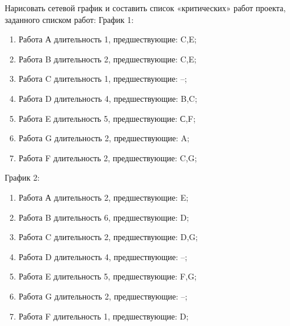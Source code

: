 \question
Нарисовать сетевой график и составить список «критических»
работ проекта, заданного списком работ:
График 1:
\begin{enumerate}
\item  Работа А длительность 1, предшествующие: C,E;
\item  Работа B длительность 2, предшествующие: C,E;
\item  Работа C длительность 1, предшествующие: --;
\item  Работа D длительность 4, предшествующие: B,C;
\item  Работа E длительность 5, предшествующие: С,F;
\item  Работа G длительность 2, предшествующие: A;
\item  Работа F длительность 2, предшествующие: C,G;
\end{enumerate}
График 2:
\begin{enumerate}
\item  Работа А длительность 2, предшествующие: E;
\item  Работа B длительность 6, предшествующие: D;
\item  Работа C длительность 2, предшествующие: D,G;
\item  Работа D длительность 4, предшествующие: --;
\item  Работа E длительность 5, предшествующие: F,G;
\item  Работа G длительность 2, предшествующие: --;
\item  Работа F длительность 1, предшествующие: D;
\end{enumerate}
